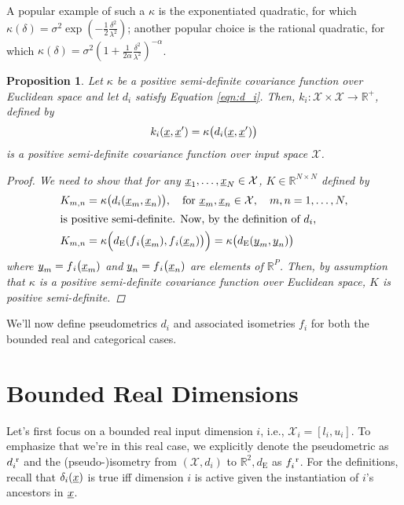 \documentclass[letterpaper]{article}
\newcommand{\vect}[1]{\underline{\smash{#1}}}
\renewcommand{\v}[1]{\vect{#1}}
\newcommand{\reals}{\mathds{R}}
\newcommand{\sX}{\mathcal{X}}
\newcommand{\br}{^{\text{\textnormal{ r}}}}
\newtheorem{prop}[thm]{Proposition}
\begin{document}
A popular example of such a $\kappa$ is the exponentiated quadratic, for which $\kappa(\delta) = \sigma^2 \exp(-\frac{1}{2} \frac{\delta^2}{\lambda^2})$; another popular choice is the rational quadratic, for which $\kappa(\delta) = \sigma^2 (1+\frac{1}{2\alpha} \frac{\delta^2}{\lambda^2})^{-\alpha}$.


\begin{prop}
Let $\kappa$ be a positive semi-definite covariance function over Euclidean space and let $d_i$ satisfy Equation \ref{eqn:d_i}. Then, 
$k_i\colon \sX \times \sX\to \reals^+$, defined by 
\[k_i(\v{x},\v{x}') = \kappa\bigl( d_i(\v{x}, \v{x}') \bigr)\]
is a positive semi-definite covariance function over input space $\sX$. 
\label{prop:psd_if_isometry}
\begin{proof}
We need to show that for any $\v{x}_1, \dots, \v{x}_N \in \sX$, $K \in \reals^{N\times N}$ defined by
\begin{align*}
 K_{m, n} & = \kappa\bigl(d{_i}(\v{x}_m,\v{x}_n)\bigr)
,\quad \text{for }
\v{x}_m, \v{x}_n \in \sX,\quad m, n = 1, \ldots, N, 
\\
\intertext{is positive semi-definite. Now, by the definition of $d_i$,}
K_{m, n} & = \kappa\Bigl(d_{\text{E}}(f{_i}\bigl(\v{x}_m), f{_i}(\v{x}_n)\bigr)\Bigr) 
= \kappa\bigl(d_{\text{E}}(\v{y}_m, \v{y}_n)\bigr)
\end{align*}
where $\v{y}_m = f{_i}\bigl(\v{x}_m)$ and $\v{y}_n = f{_i}\bigl(\v{x}_n)$ are elements of $\reals^P$.
Then, by assumption that $\kappa$ is a positive semi-definite covariance function over Euclidean space, $K$ is positive semi-definite. 
\end{proof}
\end{prop}

We'll now define pseudometrics $d_i$ and associated isometries $f_i$ for both the bounded real and categorical cases. 


\section{Bounded Real Dimensions}

Let's first focus on a bounded real input dimension $i$, i.e., $\sX_i=[l_i, u_i]$.
To emphasize that we're in this real case, we explicitly denote the pseudometric as $d\br_i$ and the (pseudo-)isometry from $(\sX, d_i)$ to $\reals^2,d_\text{E}$ 
as $f\br_i$. For the definitions, recall that $\delta_i(\v{x})$ is true iff dimension $i$ is active given the instantiation of $i$'s ancestors in $\v{x}$.
\end{document}
